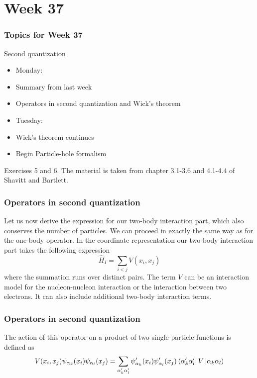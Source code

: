 \section[Week 37]{Week 37}
\frame
{
  \frametitle{Topics for Week 37}
  \begin{block}{Second quantization}
\begin{itemize}
\item Monday:
\item Summary from last week
\item Operators in second quantization and Wick's theorem
\item Tuesday:
\item Wick's theorem continues
\item Begin Particle-hole formalism
\end{itemize}
Exercises 5 and 6. 
The material is taken from chapter 3.1-3.6 and 4.1-4.4 of Shavitt and Bartlett.
  \end{block}
} 


\frame
{
  \frametitle{Operators in second quantization}
\begin{small}
{\scriptsize
Let us now derive the expression for our two-body interaction part, which also conserves the number of particles.
We can proceed in exactly the same way as for the one-body operator. In the coordinate representation our
two-body interaction part takes the following expression
\begin{equation}
	\hat{H}_I = \sum_{i<j} V(x_i,x_j) \label{eq:2-31}
\end{equation}
where the summation runs over distinct pairs. The term $V$ can be an interaction model for the nucleon-nucleon interaction
or the interaction between two electrons. It can also include additional two-body interaction terms. 
}
\end{small}
}


\frame
{
  \frametitle{Operators in second quantization}
\begin{small}
{\scriptsize
The action of this operator on a product of 
two single-particle functions is defined as 
\begin{equation}
	V(x_i,x_j) \psi_{\alpha_k}(x_i) \psi_{\alpha_l}(x_j) = \sum_{\alpha_k'\alpha_l'} 
		\psi_{\alpha_k}'(x_i)\psi_{\alpha_l}'(x_j) 
		\element{\alpha_k'\alpha_l'}{V}{\alpha_k\alpha_l} \label{eq:2-32}
\end{equation}
}
\end{small}
}


